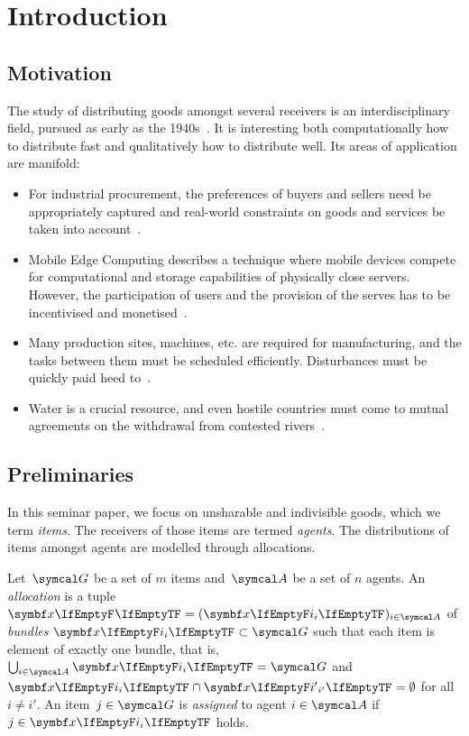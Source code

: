 \section{Introduction}
\label{sec:intro}

\subsection{Motivation}
\label{subsec:intro:motivation}

The study of distributing goods amongst several receivers is an interdisciplinary field, pursued as early as the 1940s~\cite{the_problem_of_fair_division}.
It is interesting both computationally \Dash how to distribute fast \Dash and qualitatively \Dash how to distribute well.
Its areas of application are manifold:
\begin{itemize}
	\item
	For industrial procurement, the preferences of buyers and sellers need be appropriately captured and real-world constraints on goods and services be taken into account~\cite{survey}.

	\item
	Mobile Edge Computing describes a technique where mobile devices compete for computational and storage capabilities of physically close servers.
	However, the participation of users and the provision of the serves has to be incentivised and monetised~\cite{edge_computing_auction, edge_computing_report}.

	\item
	Many production sites, machines, etc. are required for manufacturing, and the tasks between them must be scheduled efficiently.
	Disturbances must be quickly paid heed to~\cite{survey}.

	\item
	Water is a crucial resource, and even hostile countries must come to mutual agreements on the withdrawal from contested rivers~\cite{water_management}.
\end{itemize}

\subsection{Preliminaries}
\label{subsec:intro:prelim}

In this seminar paper, we focus on unsharable and indivisible goods, which we term \emph{items}.
The receivers of those items are termed \emph{agents}.
The distributions of items amongst agents are modelled through allocations.
\begin{definition}
	Let~\(\goods\) be a set of \(m\) items and~\(\agents\) be a set of \(n\) agents.
	An \emph{allocation} is a tuple \(\alloc[][] = (\alloc)_{i \in \agents}\) of \emph{bundles} \(\alloc \subset \goods\) such that each item is element of exactly one bundle, that is, \(\bigcup_{i \in \agents} \alloc = \goods\) and \(\alloc \cap \alloc[][i'] = \emptyset\) for all \(i \neq i'\).
	An item~\(j \in \goods\) is \emph{assigned} to agent \(i \in \agents\) if \(j \in \alloc\) holds.
\end{definition}

